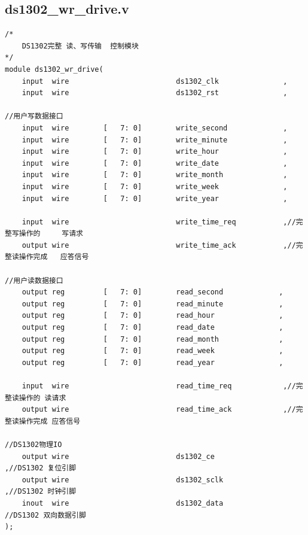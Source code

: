 \documentclass[a4paper,10pt]{article}
\begin{document}
\subsection{ds1302_wr_drive.v}
\begin{lstlisting}[caption=ds1302_wr_drive.v]
/*
	DS1302完整 读、写传输  控制模块
*/
module ds1302_wr_drive(
    input  wire                         ds1302_clk               ,
    input  wire                         ds1302_rst               ,

//用户写数据接口
    input  wire        [   7: 0]        write_second             ,
    input  wire        [   7: 0]        write_minute             ,
    input  wire        [   7: 0]        write_hour               ,
    input  wire        [   7: 0]        write_date               ,
    input  wire        [   7: 0]        write_month              ,
    input  wire        [   7: 0]        write_week               ,
    input  wire        [   7: 0]        write_year               ,

    input  wire                         write_time_req           ,//完整写操作的     写请求
    output wire                         write_time_ack           ,//完整读操作完成   应答信号

//用户读数据接口
    output reg         [   7: 0]        read_second             ,
    output reg         [   7: 0]        read_minute             ,
    output reg         [   7: 0]        read_hour               ,
    output reg         [   7: 0]        read_date               ,
    output reg         [   7: 0]        read_month              ,
    output reg         [   7: 0]        read_week               ,
    output reg         [   7: 0]        read_year               ,

    input  wire                         read_time_req            ,//完整读操作的 读请求
    output wire                         read_time_ack            ,//完整读操作完成 应答信号

//DS1302物理IO
    output wire                         ds1302_ce                ,//DS1302 复位引脚
    output wire                         ds1302_sclk              ,//DS1302 时钟引脚
    inout  wire                         ds1302_data               //DS1302 双向数据引脚  
);


\end{lstlisting}
\end{document}
